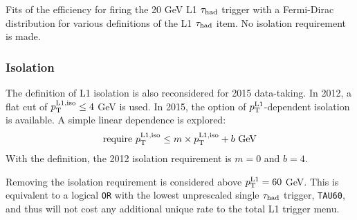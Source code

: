 \begin{table}[bp]
  \centering
  \renewcommand{\arraystretch}{1.4}
  \caption{Fits of the efficiency for firing the 20 GeV L1 $\tau_\text{had}$ trigger with a Fermi-Dirac distribution for various definitions of the L1 $\tau_\text{had}$ item. No isolation requirement is made.}
  
  \label{tab:prospects-tausize}
\end{table}

\clearpage

\subsubsection{Isolation}

The definition of L1 isolation is also reconsidered for 2015 data-taking. In 2012, a flat cut of $p_{\mathrm{T}}^\text{L1,iso} \leq 4$ GeV is used. In 2015, the option of $p_{\mathrm{T}}^\text{L1}$-dependent isolation is available. A simple linear dependence is explored:
%
\begin{equation}
  \begin{split}
    \text{require} \ \pt^\text{L1,iso} &\leq m \times \pt^\text{L1,iso} + b \ \text{GeV} \\
   \end{split}
  \label{eqn:prospects-L1iso}
\end{equation}
%
With the definition, the 2012 isolation requirement is $m=0$ and $b=4$.

Removing the isolation requirement is considered above $p_{\mathrm{T}}^\text{L1} = 60$ GeV. This is equivalent to a logical \texttt{OR} with the lowest unprescaled single $\tau_\text{had}$ trigger, \texttt{TAU60}, and thus will not cost any additional unique rate to the total L1 trigger menu.

